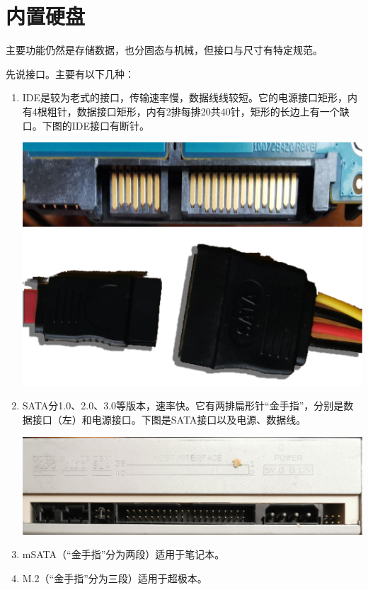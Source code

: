 \section{内置硬盘}
主要功能仍然是存储数据，也分固态与机械，但接口与尺寸有特定规范。\par
先说接口。主要有以下几种：
\begin{enumerate}
	\item IDE是较为老式的接口，传输速率慢，数据线线较短。它的电源接口矩形，内有4根粗针，数据接口矩形，内有2排每排20共40针，矩形的长边上有一个缺口。下图的IDE接口有断针。
	\begin{center}
		\includegraphics[scale=0.05]{pic/sata}\\\includegraphics[scale=0.15]{pic/SATA-Lines}	
	\end{center}
	\item SATA分1.0、2.0、3.0等版本，速率快。它有两排扁形针“金手指”，分别是数据接口（左）和电源接口。下图是SATA接口以及电源、数据线。
	\begin{center}
		\includegraphics[scale=0.05]{pic/IDE}
	\end{center}
	\item mSATA（“金手指”分为两段）适用于笔记本。
	\item M.2（“金手指”分为三段）适用于超极本。
\end{enumerate}
